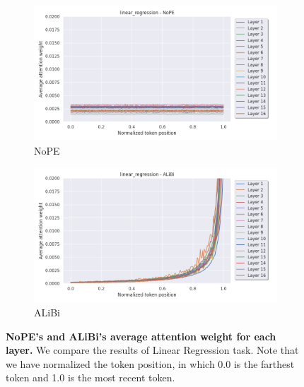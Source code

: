 \documentclass[letterpaper]{article} %
\begin{document}
\begin{figure}[tp]
    \centering
    \begin{subfigure}[t]{0.48\linewidth}
        \includegraphics[width=\linewidth]{AnonymousSubmission/LaTeX/imgs/analysis/nope_linear.png}
        \caption{NoPE}
    \end{subfigure}
    \begin{subfigure}[t]{0.48\linewidth}
        \includegraphics[width=\linewidth]{AnonymousSubmission/LaTeX/imgs/analysis/alibi_linear.png}
        \caption{ALiBi}
    \end{subfigure}
    \caption{\small\textbf{NoPE's and ALiBi's average attention weight for each layer.} We compare the results of Linear Regression task. Note that we have normalized the token position, in which 0.0 is the farthest token and 1.0 is the most recent token.}
    \label{fig:recency_lr}
\end{figure}
\end{document}
